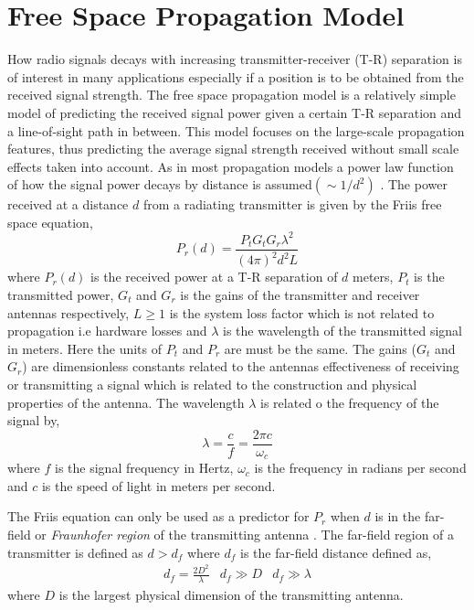 \documentclass{LTHthesis}
\begin{document}
\section{Free Space Propagation Model}
%
How radio signals decays with increasing transmitter-receiver (T-R) separation is of interest in many applications especially if a position is to be obtained from the received signal strength. The free space propagation model is a relatively simple model of predicting the received signal power given a certain T-R separation and a line-of-sight path in between. This model focuses on the large-scale propagation features, thus predicting the average signal strength received without small scale effects taken into account. As in most propagation models a power law function of how the signal power decays by distance is assumed$\left(\sim{1/d^2}\right)$ \cite{rappaport96}. The power received at a distance $d$ from a radiating transmitter is given by the Friis free space equation,
%
\begin{equation}
P_r(d)=\frac{P_tG_tG_r\lambda^2}{(4\pi)^2d^2L}\label{equation:friis_equation}
\end{equation}
%
where $P_r(d)$ is the received power at a T-R separation of $d$ meters, $P_t$ is the transmitted power, $G_t$ and $G_r$ is the gains of the transmitter and receiver antennas respectively, $L\geq1$ is the system loss factor which is not related to propagation i.e hardware losses and $\lambda$ is the wavelength of the transmitted signal in meters. Here the units of $P_t$ and $P_r$ are must be the same. The gains ($G_t$ and $G_r$) are dimensionless constants related to the antennas effectiveness of receiving or transmitting a signal which is related to the construction and physical properties of the antenna. The wavelength $\lambda$ is related o the frequency of the signal by,
\begin{equation}
\lambda=\frac{c}{f}=\frac{2\pi c}{\omega_c}
\end{equation} 
%
where $f$ is the signal frequency in Hertz, $\omega_c$ is the frequency in radians per second and $c$ is the speed of light in meters per second. 

The Friis equation can only be used as a predictor for $P_r$ when $d$ is in the far-field or \emph{Fraunhofer region} of the transmitting antenna \cite{rappaport96}. The far-field region of a transmitter is defined as $d>d_f$ where $d_f$ is the far-field distance defined as,
%
\begin{eqnarray}
d_f=\frac{2D^2}{\lambda} & d_f\gg D & d_f\gg \lambda \label{equation:frau_dist}
\end{eqnarray}
%
where $D$ is the largest physical dimension of the transmitting antenna.
\end{document}
